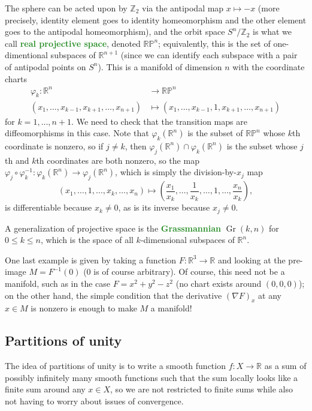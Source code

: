 \documentclass[11pt]{scrartcl}
\providecommand{\PP}{\mathbb P}
\providecommand{\RR}{\mathbb R}
\providecommand{\ZZ}{\mathbb Z}
\providecommand{\inv}{^{-1}}
\providecommand{\Gr}{\operatorname{Gr}}
\providecommand{\vocab}[1]{{\textbf{\textcolor{ForestGreen}{#1}}}}
\begin{document}
The sphere can be acted upon by $\ZZ_2$ via
the antipodal map $x\mapsto -x$ (more precisely,
identity element goes to identity homeomorphism and
the other element goes to the antipodal homeomorphism),
and the orbit space $S^n/\ZZ_2$ is what we call \vocab{real projective space},
denoted $\RR\PP^n$; equivalently, this is
the set of one-dimentional subspaces of $\RR^{n+1}$
(since we can identify each subspace with a pair of antipodal points on $S^n$).
This is a manifold of dimension $n$ with the coordinate charts
\begin{align*}
    \varphi_k\colon\RR^n &\to \RR\PP^n \\
    (x_1,\dots,x_{k-1},x_{k+1},\dots,x_{n+1})&\mapsto
    (x_1,\dots,x_{k-1},1,x_{k+1},\dots,x_{n+1})
\end{align*}
for $k=1,\dots,n+1$. We need to check that
the transition maps are diffeomorphisms in this case.
Note that $\varphi_k(\RR^n)$ is the subset of $\RR\PP^n$
whose $k$th coordinate is nonzero, so if $j\ne k$, then
$\varphi_j(\RR^n)\cap\varphi_k(\RR^n)$ is the subset
whose $j$th and $k$th coordinates are both nonzero,
so the map $\varphi_j\circ\varphi_k\inv\colon\varphi_k(\RR^n)\to\varphi_j(\RR^n)$,
which is simply the division-by-$x_j$ map
\begin{equation*}
    (x_1,\dots,1,\dots,x_k,\dots,x_n)\mapsto
    \left(\frac{x_1}{x_k},\dots,\frac{1}{x_k},\dots,1,\dots,\frac{x_n}{x_k}\right),
\end{equation*}
is differentiable because $x_k\ne 0$, as is its inverse because $x_j\ne 0$.

A generalization of projective space is the \vocab{Grassmannian}
$\Gr(k,n)$ for $0\le k\le n$, which is the space of
all $k$-dimensional subspaces of $\RR^n$.

One last example is given by taking a function $F\colon\RR^3\to\RR$
and looking at the pre-image $M = F\inv(0)$ ($0$ is of course arbitrary).
Of course, this need not be a manifold, such as in the case
$F = x^2 + y^2 - z^2$ (no chart exists around $(0,0,0)$);
on the other hand, the simple condition that the derivative $(\nabla F)_x$
at any $x\in M$ is nonzero is enough to make $M$ a manifold!

\subsection{Partitions of unity}

The idea of partitions of unity is to write a smooth function $f\colon X\to\RR$ as
a sum of possibly infinitely many smooth functions such that
the sum locally looks like a finite sum around any $x\in X$,
so we are not restricted to finite sums while also not having to worry
about issues of convergence.
\end{document}
